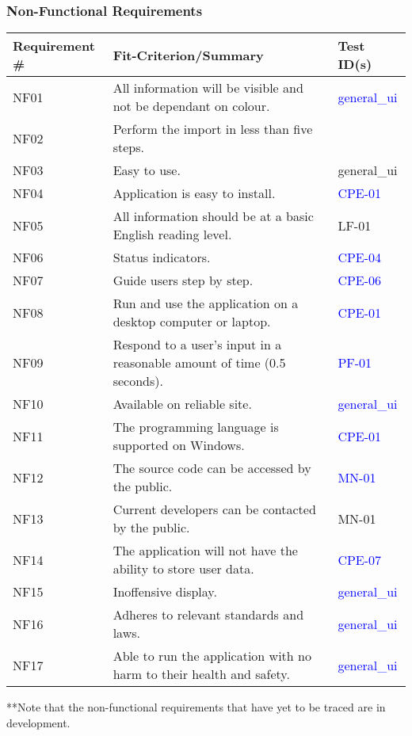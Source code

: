 \documentclass[12pt, titlepage]{article}
\begin{document}
\subsubsection{Non-Functional Requirements}

\begin{tabular}{ |p{3cm}|p{8cm}|p{2cm}| }
\hline Requirement \#  & Fit-Criterion/Summary & Test ID(s) \\
\toprule
NF01 & All information will be visible and not be dependant on colour.  &  \textcolor{blue}{general\_ui}\\
NF02 & Perform the import in less than five steps. & \\
NF03 & Easy to use. & general\_ui \\
NF04 & Application is easy to install. & \textcolor{blue}{CPE-01}\\
NF05 & All information should be at a basic English reading level.  & LF-01 \\
NF06 & Status indicators. & \textcolor{blue}{CPE-04}\\
NF07 & Guide users step by step. & \textcolor{blue}{CPE-06}\\
NF08 & Run and use the application on a desktop computer or laptop.  & \textcolor{blue}{CPE-01}\\
NF09 & Respond to a user’s input in a reasonable amount of time (0.5 seconds). & \textcolor{blue}{PF-01}\\
NF10 & Available on reliable site. & \textcolor{blue}{general\_ui}\\
NF11 & The programming language is supported on Windows.  & \textcolor{blue}{CPE-01}\\
NF12 & The source code can be accessed by the public.  & \textcolor{blue}{MN-01} \\
NF13 & Current developers can be contacted by the public.  & MN-01 \\
NF14 & The application will not have the ability to store user data. & \textcolor{blue}{CPE-07}\\
NF15 & Inoffensive display. & \textcolor{blue}{general\_ui} \\
NF16 & Adheres to relevant standards and laws. & \textcolor{blue}{general\_ui}\\
NF17 & Able to run the application with no harm to their health and safety.  & \textcolor{blue}{general\_ui}\\

\bottomrule
\end{tabular}
\caption{**Note that the non-functional requirements that have yet to be traced are in development.}
\end{document}
